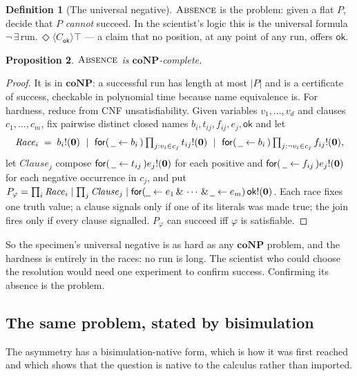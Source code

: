\documentclass[11pt]{article}
\theoremstyle{definition}
\newtheorem{definition}{Definition}[section]
\theoremstyle{plain}
\newtheorem{proposition}[definition]{Proposition}
\theoremstyle{remark}
\newcommand{\inp}[3]{\mathsf{for}(\,#1 \leftarrow #2\,)#3}
\newcommand{\out}[2]{#1!(#2)}
\newcommand{\nil}{\mathbf{0}}
\newcommand{\wild}{\mathord{\underline{\hspace{0.5em}}}}
\newcommand{\ok}{\mathsf{ok}}
\newcommand{\ABS}{\textup{\textsc{Absence}}}
\newcommand{\coNP}{\mathbf{coNP}}
\begin{document}
\begin{definition}[The universal negative]
$\ABS$ is the problem: given a flat $P$, decide that $P$ \emph{cannot}
succeed. In the scientist's logic this is the universal formula
$\lnot\,\exists\,\text{run}.\,\Diamond\langle C_\ok\rangle\top$ --- a
claim that no position, at any point of any run, offers $\ok$.
\end{definition}

\begin{proposition}\label{prop:abscomplete}
$\ABS$ is $\coNP$-complete.
\end{proposition}

\begin{proof}
It is in $\coNP$: a successful run has length at most $|P|$ and is a
certificate of success, checkable in polynomial time because name
equivalence is. For hardness, reduce from CNF unsatisfiability. Given
variables $v_1, \dots, v_d$ and clauses $c_1, \dots, c_m$, fix pairwise
distinct closed names $b_i, t_{ij}, f_{ij}, e_j, \ok$ and let
\[
\mathit{Race}_i \;=\; \out{b_i}{\nil}
  \ \mid\ \inp{\wild}{b_i}{\textstyle\prod_{j : v_i \in c_j} \out{t_{ij}}{\nil}}
  \ \mid\ \inp{\wild}{b_i}{\textstyle\prod_{j : \neg v_i \in c_j} \out{f_{ij}}{\nil}},
\]
let $\mathit{Clause}_j$ compose $\inp{\wild}{t_{ij}}{\out{e_j}{\nil}}$
for each positive and $\inp{\wild}{f_{ij}}{\out{e_j}{\nil}}$ for each
negative occurrence in $c_j$, and put
$P_\varphi = \prod_i \mathit{Race}_i \mid \prod_j \mathit{Clause}_j \mid
\mathsf{for}(\wild \leftarrow e_1 \,\&\, \cdots \,\&\, \wild \leftarrow
e_m)\, \out{\ok}{\nil}$. Each race fixes one truth value; a clause
signals only if one of its literals was made true; the join fires only if
every clause signalled. $P_\varphi$ can succeed iff $\varphi$ is
satisfiable.
\end{proof}

So the specimen's universal negative is as hard as any $\coNP$ problem,
and the hardness is entirely in the races: no run is long. The scientist
who could choose the resolution would need one experiment to confirm
success. Confirming its absence is the problem.

\subsection{The same problem, stated by bisimulation}\label{sec:normaliser}

The asymmetry has a bisimulation-native form, which is how it was first
reached and which shows that the question is native to the calculus
rather than imported.
\end{document}
